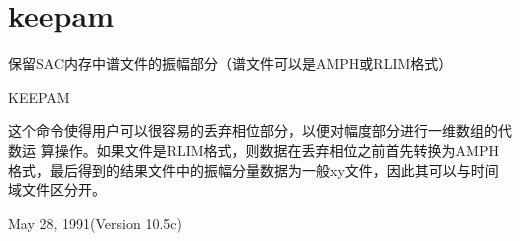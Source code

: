 \section{keepam}
\label{cmd:keepam}

保留SAC内存中谱文件的振幅部分（谱文件可以是AMPH或RLIM格式）

KEEPAM

这个命令使得用户可以很容易的丢弃相位部分，以便对幅度部分进行一维数组的代数运	算操作。如果文件是RLIM格式，则数据在丢弃相位之前首先转换为AMPH格式，最后得到的结果文件中的振幅分量数据为一般xy文件，因此其可以与时间域文件区分开。

May 28, 1991(Version 10.5c)
